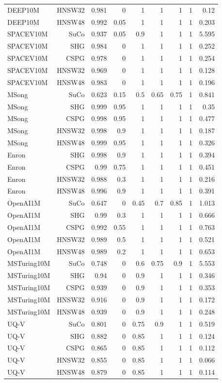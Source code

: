 \begin{table}[t]
\begin{tabular}{lrrrrrrrr}
DEEP10M & HNSW32 & 0.981 & 0 & 1 & 1 & 1 & 1 & 0.12 \\
DEEP10M & HNSW48 & 0.992 & 0.05 & 1 & 1 & 1 & 1 & 0.203 \\
SPACEV10M & SuCo & 0.937 & 0.05 & 0.9 & 1 & 1 & 1 & 5.595 \\
SPACEV10M & SHG & 0.984 & 0 & 1 & 1 & 1 & 1 & 0.252 \\
SPACEV10M & CSPG & 0.978 & 0 & 1 & 1 & 1 & 1 & 0.254 \\
SPACEV10M & HNSW32 & 0.969 & 0 & 1 & 1 & 1 & 1 & 0.128 \\
SPACEV10M & HNSW48 & 0.983 & 0 & 1 & 1 & 1 & 1 & 0.196 \\
MSong & SuCo & 0.623 & 0.15 & 0.5 & 0.65 & 0.75 & 1 & 0.841 \\
MSong & SHG & 0.999 & 0.95 & 1 & 1 & 1 & 1 & 0.35 \\
MSong & CSPG & 0.998 & 0.95 & 1 & 1 & 1 & 1 & 0.477 \\
MSong & HNSW32 & 0.998 & 0.9 & 1 & 1 & 1 & 1 & 0.187 \\
MSong & HNSW48 & 0.999 & 0.95 & 1 & 1 & 1 & 1 & 0.326 \\
Enron & SHG & 0.998 & 0.9 & 1 & 1 & 1 & 1 & 0.394 \\
Enron & CSPG & 0.99 & 0.75 & 1 & 1 & 1 & 1 & 0.451 \\
Enron & HNSW32 & 0.988 & 0.3 & 1 & 1 & 1 & 1 & 0.216 \\
Enron & HNSW48 & 0.996 & 0.9 & 1 & 1 & 1 & 1 & 0.391 \\
OpenAI1M & SuCo & 0.647 & 0 & 0.45 & 0.7 & 0.85 & 1 & 1.013 \\
OpenAI1M & SHG & 0.99 & 0.3 & 1 & 1 & 1 & 1 & 0.666 \\
OpenAI1M & CSPG & 0.992 & 0.55 & 1 & 1 & 1 & 1 & 0.763 \\
OpenAI1M & HNSW32 & 0.989 & 0.5 & 1 & 1 & 1 & 1 & 0.521 \\
OpenAI1M & HNSW48 & 0.989 & 0.2 & 1 & 1 & 1 & 1 & 0.653 \\
MSTuring10M & SuCo & 0.748 & 0 & 0.6 & 0.75 & 0.9 & 1 & 5.553 \\
MSTuring10M & SHG & 0.94 & 0 & 0.9 & 1 & 1 & 1 & 0.346 \\
MSTuring10M & CSPG & 0.939 & 0 & 0.9 & 1 & 1 & 1 & 0.353 \\
MSTuring10M & HNSW32 & 0.916 & 0 & 0.9 & 1 & 1 & 1 & 0.172 \\
MSTuring10M & HNSW48 & 0.939 & 0 & 0.9 & 1 & 1 & 1 & 0.248 \\
UQ-V & SuCo & 0.801 & 0 & 0.75 & 0.9 & 1 & 1 & 0.519 \\
UQ-V & SHG & 0.882 & 0 & 0.85 & 1 & 1 & 1 & 0.124 \\
UQ-V & CSPG & 0.865 & 0 & 0.85 & 1 & 1 & 1 & 0.112 \\
UQ-V & HNSW32 & 0.855 & 0 & 0.85 & 1 & 1 & 1 & 0.066 \\
UQ-V & HNSW48 & 0.879 & 0 & 0.85 & 1 & 1 & 1 & 0.114 \\
\bottomrule
\end{tabular}
\end{table}
